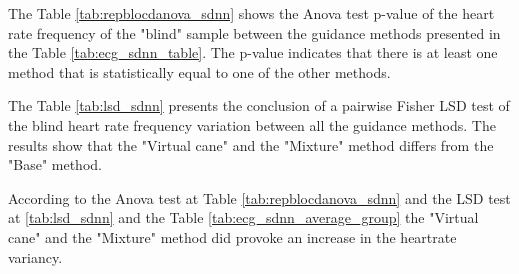 The Table \ref{tab:repblocdanova_sdnn} shows the Anova test p-value of the heart rate frequency of the "blind" sample between the guidance methods presented in the Table \ref{tab:ecg_sdnn_table}. The p-value indicates that there is at least one method that is statistically equal to one of the other methods.



The Table \ref{tab:lsd_sdnn} presents the conclusion of a pairwise Fisher LSD test of the blind heart rate frequency variation between all the guidance methods. The results show that the "Virtual cane" and the "Mixture" method differs from the "Base" method.



According to the Anova test at Table \ref{tab:repblocdanova_sdnn} and the LSD test at \ref{tab:lsd_sdnn} and the Table \ref{tab:ecg_sdnn_average_group} the "Virtual cane" and the "Mixture" method did provoke an increase in the heartrate variancy.

\FloatBarrier